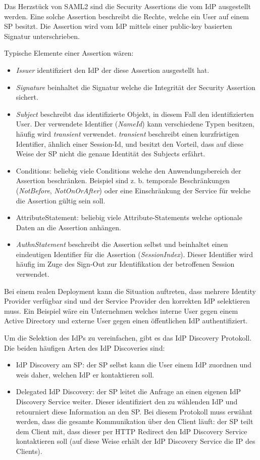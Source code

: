Das Herzstück von SAML2 sind die Security Assertions die vom IdP ausgestellt werden. Eine solche Assertion beschreibt die Rechte, welche ein User auf einem SP besitzt. Die Assertion wird vom IdP mittels einer public-key basierten Signatur unterschrieben.

Typische Elemente einer Assertion wären:

\begin{itemize}
	\item \textit{Issuer} identifiziert den IdP der diese Assertion ausgestellt hat.
	\item \textit{Signature} beinhaltet die Signatur welche die Integrität der Security Assertion sichert.
	\item \textit{Subject} beschreibt das identifizierte Objekt, in diesem Fall den identifizierten User. Der verwendete Identifier (\textit{NameId}) kann verschiedene Typen besitzen, häufig wird \textit{transient} verwendet. \textit{transient} beschreibt einen kurzfristigen Identifier, ähnlich einer Session-Id, und besitzt den Vorteil, dass auf diese Weise der SP nicht die genaue Identität des Subjects erfährt.
	\item Conditions: beliebig viele Conditions welche den Anwendungsbereich der Assertion beschränken. Beispiel sind z. b. temporale Beschränkungen (\textit{NotBefore}, \textit{NotOnOrAfter}) oder eine Einschränkung der Service für welche die Assertion gültig sein soll.
	\item AttributeStatement: beliebig viele Attribute-Statements welche optionale Daten an die Assertion anhängen.
	\item \textit{AuthnStatement} beschreibt die Assertion selbst und beinhaltet einen eindeutigen Identifier für die Assertion (\textit{SessionIndex}). Dieser Identifier wird häufig im Zuge des Sign-Out zur Identifikation der betroffenen Session verwendet.
\end{itemize}

Bei einem realen Deployment kann die Situation auftreten, dass mehrere Identity Provider verfügbar sind und der Service Provider den korrekten IdP selektieren muss. Ein Beispiel wäre ein Unternehmen welches interne User gegen einem Active Directory und externe User gegen einen öffentlichen IdP authentifiziert.

Um die Selektion des IdPs zu vereinfachen, gibt es das IdP Discovery Protokoll. Die beiden häufigen Arten des IdP Discoveries sind:

\begin{itemize}
	\item IdP Discovery am SP: der SP selbst kann die User einem IdP zuordnen und weis daher, welchen IdP er kontaktieren soll.
	\item Delegated IdP Discovery: der SP leitet die Anfrage an einen eigenen IdP Discovery Service weiter. Dieser identifiziert den zu wählenden IdP und retourniert diese Information an den SP. Bei diesem Protokoll muss erwähnt werden, dass die gesamte Kommunikation über den Client läuft: der SP teilt dem Client mit, dass dieser per HTTP Redirect den IdP Discovery Service kontaktieren soll (auf diese Weise erhält der IdP Discovery Service die IP des Clients).
\end{itemize}

